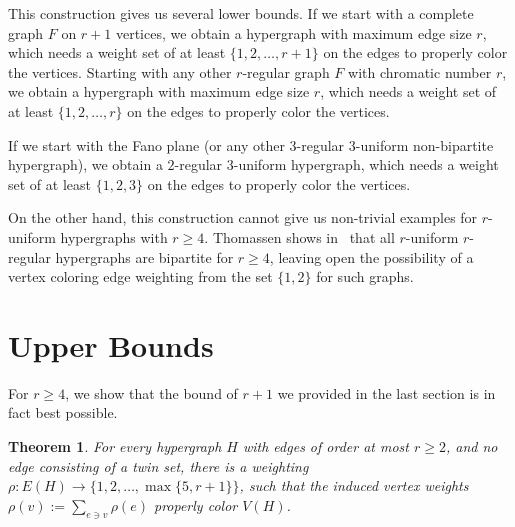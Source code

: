 \documentclass[reqno,12pt,epsf]{amsart}
\newtheorem{theorem}{Theorem}     %
\def\omm{\rho}
\begin{document}
This construction gives us several lower bounds. If we start with a complete graph $F$ on $r+1$ vertices, we obtain a hypergraph with maximum edge size $r$,  which needs a weight set of at least $\{1,2,\ldots,r+1\}$ on the edges to properly color the vertices. Starting with any other $r$-regular graph $F$ with chromatic number $r$,  we obtain a hypergraph with maximum edge size $r$,  which needs a weight set of at least $\{1,2,\ldots,r\}$ on the edges to properly color the vertices.

If we start with the Fano plane (or any other $3$-regular $3$-uniform non-bipartite hypergraph), we obtain a $2$-regular $3$-uniform hypergraph, which needs a weight set of at least $\{1,2,3\}$ on the edges to properly color the vertices. 

On the other hand, this construction cannot give us non-trivial examples for $r$-uniform hypergraphs with $r\ge 4$.  Thomassen shows in~\cite{T} that all $r$-uniform $r$-regular hypergraphs are bipartite for $r\ge 4$, leaving open the possibility of a vertex coloring edge weighting from the set $\{1,2\}$ for such graphs.

\section{Upper Bounds}

For $r\ge 4$, we show that the bound of $r+1$ we provided in the last section is in fact best possible. %
\begin{theorem}\label{Thm:Main}
For every hypergraph $H$ with edges of order at most $r\ge 2$, and no edge consisting of a twin set, there is a weighting $\omm: E(H)\to \{1,2,\ldots,\max\{5,r+1\}\}$,
such that the induced vertex weights $\omm(v):=\sum_{e\ni v}\omm(e)$ properly color $V(H)$.
\end{theorem}
\end{document}
